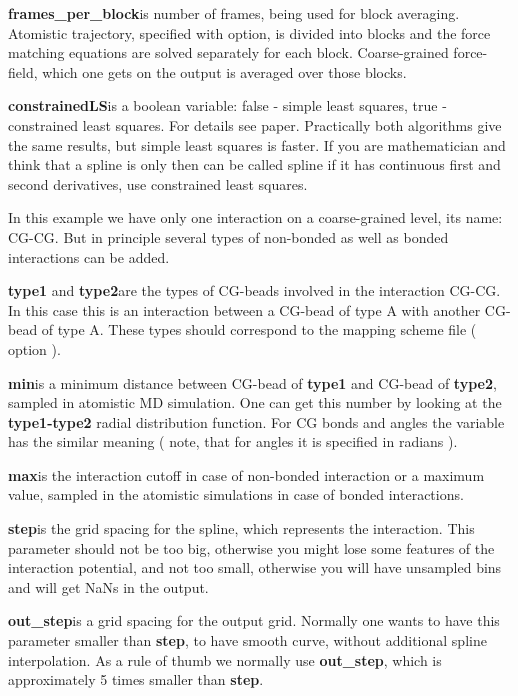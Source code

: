 \textbf{frames\_per\_block}\newline is number of frames, being used for block averaging. Atomistic trajectory, specified with
\textbf{} option, is divided into blocks and the force matching equations are solved separately for each block.
Coarse-grained force-field, which one gets on the output is averaged over those blocks.

\textbf{constrainedLS}\newline is a boolean variable: false - simple least squares, true - constrained least squares. For details see \votca paper.
Practically both algorithms give the same results, but simple least squares is faster. If you are mathematician and think that a spline is only then can be called spline if it has continuous first and second derivatives, use constrained least squares. \newline

In this example we have only one interaction on a coarse-grained level, its name: CG-CG. But in principle several types of non-bonded as well as bonded interactions can be added. 

\textbf{type1} and \textbf{type2}\newline are the types of CG-beads involved in the interaction CG-CG. In this case this is an interaction between a CG-bead of type A with another CG-bead of type A. These types should correspond to the mapping scheme file ( option \textbf{} ).
 
\textbf{min}\newline is a minimum distance between CG-bead of \textbf{type1} and CG-bead of \textbf{type2},  sampled in atomistic MD simulation. One can get this number by looking at the \textbf{type1-type2} radial distribution function. For CG bonds and angles the variable has the similar meaning ( note, that for angles it is specified in radians ).

\textbf{max}\newline is the interaction cutoff in case of non-bonded interaction or a maximum value, sampled in the atomistic simulations in case of bonded interactions.

\textbf{step}\newline is the grid spacing for the spline, which represents the interaction. This parameter should not be too big, otherwise you might lose some features of the interaction potential, and not too small, otherwise you will have unsampled bins and will get NaNs in the output.

\textbf{out\_step}\newline is a grid spacing for the output grid. Normally one wants to have this parameter smaller than \textbf{step}, 
to have smooth curve, without additional spline interpolation. 
As a rule of thumb we normally use \textbf{out\_step}, which is approximately 5 times smaller than \textbf{step}.

